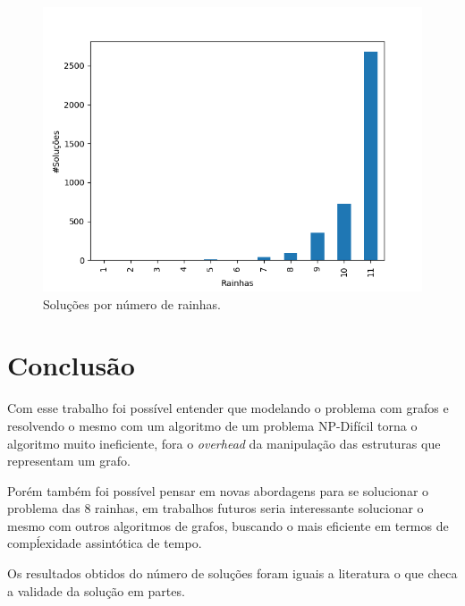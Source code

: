 \documentclass[11pt]{article}
\begin{document}
\begin{figure}[htbp]
\centering
\includegraphics[width=.9\linewidth]{num_solutions.png}
\caption{\label{fig:solution}
Soluções por número de rainhas.}
\end{figure}



\section{Conclusão}
\label{sec:orgeae9eef}

Com esse trabalho foi possível entender que modelando o problema com grafos e resolvendo o mesmo com um algoritmo de um problema NP-Difícil torna o algoritmo muito ineficiente, fora o \emph{overhead} da manipulação das estruturas que representam um grafo.

Porém também foi possível pensar em novas abordagens para se solucionar o problema das 8 rainhas, em trabalhos futuros seria interessante solucionar o mesmo com outros algoritmos de grafos, buscando o mais eficiente em termos de compĺexidade assintótica de tempo.

Os resultados obtidos do número de soluções foram iguais a literatura o que checa a validade da solução em partes.




\end{document}
